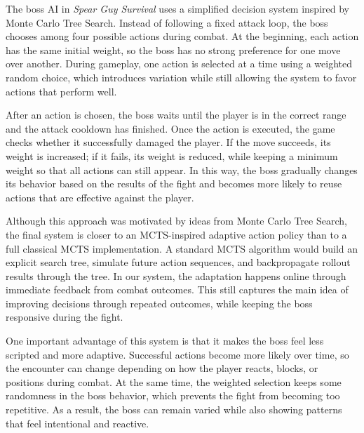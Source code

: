 \documentclass{article}
\begin{document}
The boss AI in \textit{Spear Guy Survival} uses a simplified decision system inspired by Monte Carlo Tree Search. Instead of following a fixed attack loop, the boss chooses among four possible actions during combat. At the beginning, each action has the same initial weight, so the boss has no strong preference for one move over another. During gameplay, one action is selected at a time using a weighted random choice, which introduces variation while still allowing the system to favor actions that perform well.

After an action is chosen, the boss waits until the player is in the correct range and the attack cooldown has finished. Once the action is executed, the game checks whether it successfully damaged the player. If the move succeeds, its weight is increased; if it fails, its weight is reduced, while keeping a minimum weight so that all actions can still appear. In this way, the boss gradually changes its behavior based on the results of the fight and becomes more likely to reuse actions that are effective against the player.

Although this approach was motivated by ideas from Monte Carlo Tree Search, the final system is closer to an MCTS-inspired adaptive action policy than to a full classical MCTS implementation. A standard MCTS algorithm would build an explicit search tree, simulate future action sequences, and backpropagate rollout results through the tree. In our system, the adaptation happens online through immediate feedback from combat outcomes. This still captures the main idea of improving decisions through repeated outcomes, while keeping the boss responsive during the fight.

One important advantage of this system is that it makes the boss feel less scripted and more adaptive. Successful actions become more likely over time, so the encounter can change depending on how the player reacts, blocks, or positions during combat. At the same time, the weighted selection keeps some randomness in the boss behavior, which prevents the fight from becoming too repetitive. As a result, the boss can remain varied while also showing patterns that feel intentional and reactive.
\end{document}
